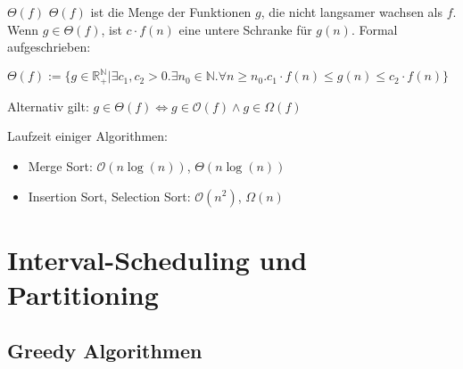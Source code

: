 \documentclass{panikzettel}
\begin{document}
\begin{defi}{$\Theta(f)$}
		$\Theta(f)$ ist die Menge der Funktionen $g$, die nicht langsamer wachsen als $f$. Wenn $g\in \Theta(f)$, ist $c \cdot f(n)$ eine untere Schranke für $g(n)$. Formal aufgeschrieben:
		
		$\Theta(f):=\{g \in \mathbb{{R}^{\mathbb{N}}_+} | \exists c_1,c_2 >0. \exists n_0 \in \mathbb{N}. \forall n \geq n_0 . c_1 \cdot f(n) \leq g(n) \leq c_2 \cdot f(n) \}$
		
		Alternativ gilt: $g \in \Theta(f) \Leftrightarrow g \in \mathcal{O}(f) \land g \in \Omega (f)$
\end{defi}
	


Laufzeit einiger Algorithmen:

\begin{itemize}
	\item Merge Sort: $\mathcal{O}(n \log (n))$, $\Theta (n \log (n))$
	\item Insertion Sort, Selection Sort: $\mathcal{O}(n^2)$, $\Omega (n)$
\end{itemize}


\newpage
\section{Interval-Scheduling und Partitioning}

\subsection{Greedy Algorithmen}
\end{document}
